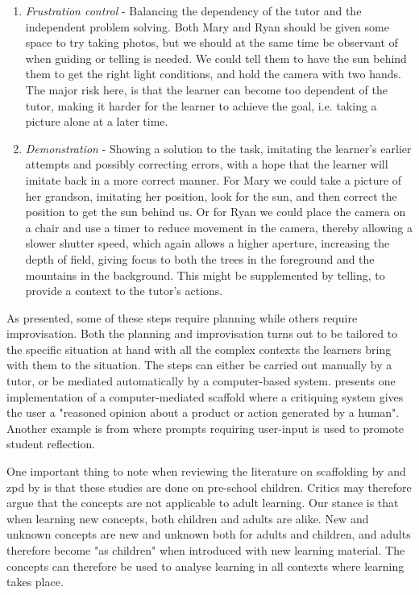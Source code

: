 \begin{enumerate}
\item{} \emph{Frustration control} - Balancing the dependency of the tutor and the independent problem solving. Both Mary and Ryan should be given some space to try taking photos, but we should at the same time be observant of when guiding or telling is needed. We could tell them to have the sun behind them to get the right light conditions, and hold the camera with two hands. The major risk here, is that the learner can become too dependent of the tutor, making it harder for the learner to achieve the goal, i.e. taking a picture alone at a later time.  

\item{}  \emph{Demonstration} - Showing a solution to the task, imitating the learner's earlier attempts and possibly correcting errors, with a hope that the learner will imitate back in a more correct manner. For Mary we could take a picture of her grandson, imitating her position, look for the sun, and then correct the position to get the sun behind us. Or for Ryan we could place the camera on a chair and use a timer to reduce movement in the camera, thereby allowing a slower shutter speed, which again allows a higher aperture, increasing the depth of field, giving focus to both the trees in the foreground and the mountains in the background. This might be supplemented by telling, to provide a context to the tutor's actions.
\end{enumerate}

As presented, some of these steps require planning while others require improvisation. Both the planning and improvisation turns out to be tailored to the specific situation at hand with all the complex contexts the learners bring with them to the situation. The steps can either be carried out manually by a tutor, or be mediated automatically by a computer-based system. \citet{fischer1991critics} presents one implementation of a computer-mediated scaffold where a critiquing system gives the user a "reasoned opinion about a product or action generated by a human". Another example is from \citet{furberg2009socio} where prompts requiring user-input is used to promote student reflection. 

One important thing to note when reviewing the literature on scaffolding by \citet{wood1976role} and zpd by \citet{vygotskiui1978mind} is that these studies are done on pre-school children. Critics may therefore argue that the concepts are not applicable to adult learning. Our stance is that when learning new concepts, both children and adults are alike. New and unknown concepts are new and unknown both for adults and children, and adults therefore become "as children" when introduced with new learning material. The concepts can therefore be used to analyse learning in all contexts where learning takes place. 

